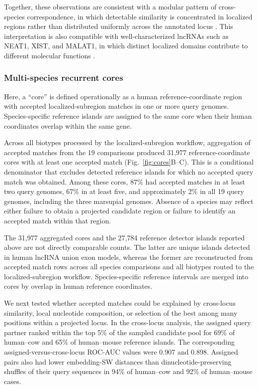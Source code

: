 Together, these observations are consistent with a modular pattern of
cross-species correspondence, in which detectable similarity is concentrated in
localized regions rather than distributed uniformly across the annotated locus
\citep{hezroniPrinciplesLongNoncoding2015,
  rivasEvolutionaryConservationRNA2021,
  ulitskyEvolutionRescueUsing2016,
  mattickLongNoncodingRNAs2023,
  quinnUniqueFeaturesLong2016}.
This interpretation is also compatible with well-characterized lncRNAs such as
NEAT1, XIST, and MALAT1, in which distinct localized domains contribute to
different molecular functions
\citep{wiluszTripleHelixStabilizes2012,
  yamazakiFunctionalDomainsNEAT12018,
  engreitzXistLncRNAExploits2013}.

\subsubsection{Multi-species recurrent cores}

Here, a ``core'' is defined operationally as a human reference-coordinate region
with accepted localized-subregion matches in one or more query genomes.
Species-specific reference islands are assigned to the same core when their human
coordinates overlap within the same gene.

Across all biotypes processed by the localized-subregion workflow, aggregation of
accepted matches from the 19 comparisons produced 31{,}977 reference-coordinate
cores with at least one accepted match
(Fig.~\ref{fig:cores}B--C). This is a conditional denominator that excludes
detected reference islands for which no accepted query match was obtained.
Among these cores, 87\% had accepted matches in at least two query genomes, 67\%
in at least five, and approximately 2\% in all 19 query genomes, including the
three marsupial genomes. Absence of a species may reflect either failure to
obtain a projected candidate region or failure to identify an accepted match
within that region.

The 31{,}977 aggregated cores and the 27{,}784 reference detector islands
reported above are not directly comparable counts. The latter are unique islands
detected in human lncRNA union exon models, whereas the former are reconstructed
from accepted match rows across all species comparisons and all biotypes routed
to the localized-subregion workflow. Species-specific reference intervals are
merged into cores by overlap in human reference coordinates.

We next tested whether accepted matches could be explained by cross-locus
similarity, local nucleotide composition, or selection of the best among many
positions within a projected locus. In the cross-locus analysis, the assigned
query partner ranked within the top 5\% of the sampled candidate pool for 69\%
of human--cow and 65\% of human--mouse reference islands. The corresponding
assigned-versus-cross-locus ROC-AUC values were 0.907 and 0.898. Assigned pairs
also had lower embedding-SW distances than dinucleotide-preserving shuffles of
their query sequences in 94\% of human--cow and 92\% of human--mouse cases.

